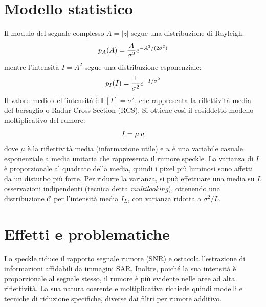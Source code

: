 \section{Modello statistico}
Il modulo del segnale complesso $A = |z|$ segue una distribuzione di Rayleigh:
\begin{equation}
  \makebox[\textwidth][c]{%
    $\displaystyle
    p_A(A) = \frac{A}{\sigma^2} e^{-A^2 / (2\sigma^2)}
    $%
  }
\end{equation}
mentre l’intensità $I = A^2$ segue una distribuzione esponenziale:
\begin{equation}
  \makebox[\textwidth][c]{%
    $\displaystyle
    p_I(I) = \frac{1}{\sigma^2} e^{-I / \sigma^2}
    $%
  }
\end{equation}
Il valore medio dell’intensità è $\mathbb{E}[I] = \sigma^2$, che rappresenta la riflettività media del bersaglio o Radar Cross Section (RCS).  
Si ottiene così il cosiddetto modello moltiplicativo del rumore:
\begin{equation}
  \makebox[\textwidth][c]{%
    $\displaystyle
    I = \mu \, u
    $%
  }
\end{equation}
dove $\mu$ è la riflettività media (informazione utile) e $u$ è una variabile casuale esponenziale a media unitaria che rappresenta il rumore speckle.  
La varianza di $I$ è proporzionale al quadrato della media, quindi i pixel più luminosi sono affetti da un disturbo più forte.
Per ridurre la varianza, si può effettuare una media su $L$ osservazioni indipendenti (tecnica detta \emph{multilooking}), ottenendo una distribuzione $\mathcal{C}$ per l’intensità media $I_L$, con varianza ridotta a $\sigma^2 / L$.
\section{Effetti e problematiche}
Lo speckle riduce il rapporto segnale rumore (SNR) e ostacola l’estrazione di informazioni affidabili da immagini SAR.  
Inoltre, poiché la sua intensità è proporzionale al segnale stesso, il rumore è più evidente nelle aree ad alta riflettività.  
La sua natura coerente e moltiplicativa richiede quindi modelli e tecniche di riduzione specifiche, diverse dai filtri per rumore additivo.
